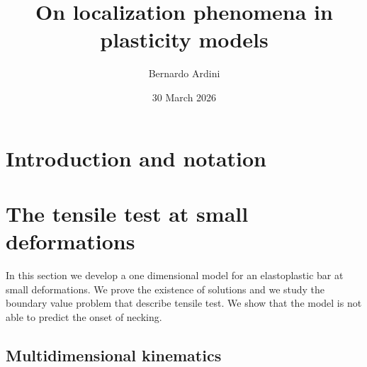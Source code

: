 \documentclass[letterpaper,oneside]{amsart}
\numberwithin{equation}{section}
\theoremstyle{definition}
\begin{document}
\title{On localization phenomena in plasticity models}

\author{Bernardo Ardini}

\date{30 March 2026}

\begin{abstract}
\end{abstract}

\maketitle

\tableofcontents

\section{Introduction and notation}

\section{The tensile test at small deformations}

In this section we develop a one dimensional model for an elastoplastic bar at small deformations. We prove the existence of solutions and we study the boundary value problem that describe tensile test. We show that the model is not able to predict the onset of necking.

\subsection{Multidimensional kinematics}
\end{document}
